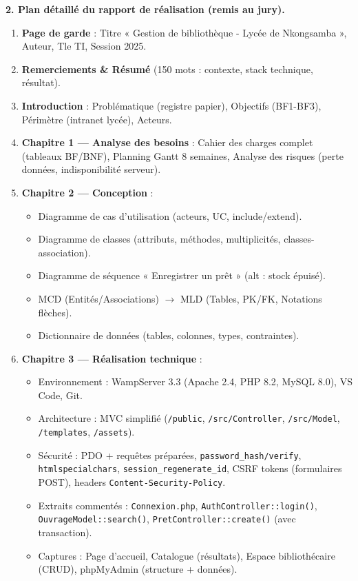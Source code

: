 \documentclass[11pt]{article}
\begin{document}
\begin{exoresolu}
\textbf{2. Plan détaillé du rapport de réalisation (remis au jury).}
\begin{enumerate}
\item \textbf{Page de garde} : Titre « Gestion de bibliothèque - Lycée de Nkongsamba », Auteur, Tle TI, Session 2025.
\item \textbf{Remerciements \& Résumé} (150 mots : contexte, stack technique, résultat).
\item \textbf{Introduction} : Problématique (registre papier), Objectifs (BF1-BF3), Périmètre (intranet lycée), Acteurs.
\item \textbf{Chapitre 1 — Analyse des besoins} : Cahier des charges complet (tableaux BF/BNF), Planning Gantt 8 semaines, Analyse des risques (perte données, indisponibilité serveur).
\item \textbf{Chapitre 2 — Conception} :
      \begin{itemize}
      \item Diagramme de cas d'utilisation (acteurs, UC, include/extend).
      \item Diagramme de classes (attributs, méthodes, multiplicités, classes-association).
      \item Diagramme de séquence « Enregistrer un prêt » (alt : stock épuisé).
      \item MCD (Entités/Associations) $\rightarrow$ MLD (Tables, PK/FK, Notations flèches).
      \item Dictionnaire de données (tables, colonnes, types, contraintes).
      \end{itemize}
\item \textbf{Chapitre 3 — Réalisation technique} :
      \begin{itemize}
      \item Environnement : WampServer 3.3 (Apache 2.4, PHP 8.2, MySQL 8.0), VS Code, Git.
      \item Architecture : MVC simplifié (\texttt{/public}, \texttt{/src/Controller}, \texttt{/src/Model}, \texttt{/templates}, \texttt{/assets}).
      \item Sécurité : PDO + requêtes préparées, \texttt{password\_hash/verify}, \texttt{htmlspecialchars}, \texttt{session\_regenerate\_id}, CSRF tokens (formulaires POST), headers \texttt{Content-Security-Policy}.
      \item Extraits commentés : \texttt{Connexion.php}, \texttt{AuthController::login()}, \texttt{OuvrageModel::search()}, \texttt{PretController::create()} (avec transaction).
      \item Captures : Page d'accueil, Catalogue (résultats), Espace bibliothécaire (CRUD), phpMyAdmin (structure + données).

\end{itemize}
\end{enumerate}
\end{exoresolu}
\end{document}
